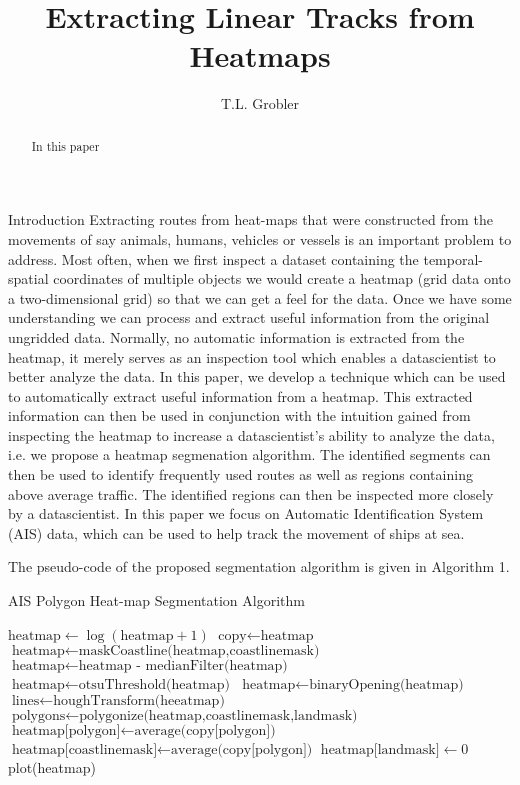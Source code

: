 \documentclass[a4paper,10pt]{article}
\title{Extracting Linear Tracks from Heatmaps}
\author{T.L. Grobler}
\begin{document}
\maketitle
\begin{abstract}
In this paper 
\end{abstract}

\begin{section}{Introduction}
Extracting routes from heat-maps that were constructed from the movements of say animals, humans, vehicles or vessels is an important problem to address. Most often, when we
first inspect a dataset containing the temporal-spatial coordinates of multiple objects we would create a heatmap (grid data onto a two-dimensional grid) so that we can get a feel for the data. Once we have some understanding 
we can process and extract useful information from the original ungridded data. Normally, no automatic information is extracted from the heatmap, it merely serves as an inspection tool
which enables a datascientist to better analyze the data. In this paper, we develop a technique which can be used to automatically extract useful information from a heatmap. This extracted 
information can then be used in conjunction with the intuition gained from inspecting the heatmap to increase a datascientist's ability to analyze the data, i.e. we propose a 
heatmap segmenation algorithm. The identified segments can then be used 
to identify frequently used routes as well as  regions containing above average traffic. The identified regions can then be inspected more closely by a datascientist.
In this paper we focus on Automatic Identification System (AIS) data, which can be used to help track the movement of ships at sea.

The pseudo-code of the proposed segmentation algorithm is given in Algorithm 1. 
\begin{algorithm}
 \caption{AIS Polygon Heat-map Segmentation Algorithm}\label{euclid}
 \begin{algorithmic}[1]
 \State $\textrm{heatmap} \gets \log(\textrm{heatmap}+1)$
 \State $\textrm{copy} \gets \textrm{heatmap}$
 \State $\textrm{heatmap} \gets \textrm{maskCoastline(heatmap,coastlinemask)}$
 \State $\textrm{heatmap} \gets \textrm{heatmap - medianFilter(heatmap)}$ 
 \State $\textrm{heatmap} \gets \textrm{otsuThreshold(heatmap)}$
 \State $\textrm{heatmap} \gets \textrm{binaryOpening(heatmap)}$
 \State $\textrm{lines} \gets \textrm{houghTransform(heeatmap)}$
 \State $\textrm{polygons} \gets \textrm{polygonize(heatmap,coastlinemask,landmask)}$
     \State $\textrm{heatmap[polygon]} \gets \textrm{average(copy[polygon])}$ 
 \EndFor
 \State $\textrm{heatmap[coastlinemask]} \gets \textrm{average(copy[polygon])}$
 \State $\textrm{heatmap[landmask]} \gets 0$
 \State plot(heatmap)
 

\end{algorithmic}
\end{algorithm}
\end{section}
\end{document}
